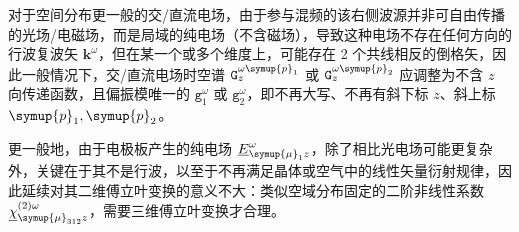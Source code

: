 对于空间分布更一般的交/直流电场，由于参与混频的该右侧波源并非可自由传播的光场/电磁场，而是局域的纯电场（不含磁场），导致这种电场不存在任何方向的行波复波矢 $\symbf{k}^\omega$，但在某一个或多个维度上，可能存在 2 个共线相反的倒格矢，因此一般情况下，交/直流电场时空谱 ${\mathtt{G}}^{\omega{\symup{p}}_{1}}_{z}$ 或 ${\mathtt{G}}^{\omega{\symup{p}}_{2}}_{z}$ 应调整为不含 $z$ 向传递函数，且偏振模唯一的 ${\mathtt{g}}^{\omega}_1$ 或 ${\mathtt{g}}^{\omega}_2$，即不再大写、不再有斜下标 $z$、斜上标 ${\symup{p}}_{1}, {\symup{p}}_{2}$。

更一般地，由于电极板产生的纯电场 $\underline{E}^\omega_{{\symup{\mu}}_1 z}$，除了相比光电场可能更复杂外，关键在于其不是行波，以至于不再满足晶体或空气中的线性矢量衍射规律，因此延续对其二维傅立叶变换的意义不大：类似空域分布固定的二阶非线性系数 ${\underline{\chi}}^{(2)\omega}_{ {\symup{\mu}}_{312}z}$，需要三维傅立叶变换才合理。


